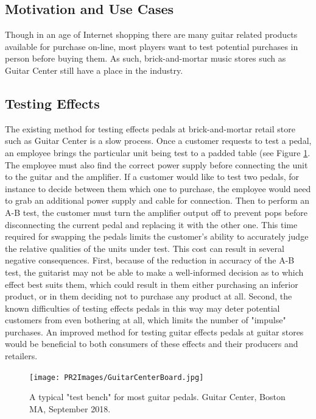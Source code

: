 \documentclass{article}
\begin{document}
	\subsection{Motivation and Use Cases}

	
	Though in an age of Internet shopping there are many guitar related products available for purchase on-line, most players want to test potential purchases in person before buying them.  As such, brick-and-mortar music stores such as Guitar Center still have a place in the industry.
	\subsection{Testing Effects}
	The existing method for testing effects pedals at brick-and-mortar retail store such as Guitar Center is a slow process.  Once a customer requests to test a pedal, an employee brings the particular unit being test to a padded table (see Figure \ref{fig:GuitarCenterBoard}.  The employee must also find the correct power supply before connecting the unit to the guitar and the amplifier.  If a customer would like to test two pedals, for instance to decide between them which one to purchase, the employee would need to grab an additional power supply and cable for connection.  Then to perform an A-B test, the customer must turn the amplifier output off to prevent pops before disconnecting the current pedal and replacing it with the other one.  This time required for swapping the pedals limits the customer's ability to accurately judge the relative qualities of the units under test.  This cost can result in several negative consequences.  First, because of the reduction in accuracy of the A-B test, the guitarist may not be able to make a well-informed decision as to which effect best suits them, which could result in them either purchasing an inferior product, or in them deciding not to purchase any product at all.  Second, the known difficulties of testing effects pedals in this way may deter potential customers from even bothering at all, which limits the number of "impulse" purchases.  An improved method for testing guitar effects pedals at guitar stores would be beneficial to both consumers of these effects and their producers and retailers.

	\begin{figure}
		\centering
		\texttt{[image: PR2Images/GuitarCenterBoard.jpg]}
		\caption{A typical "test bench" for most guitar pedals.  Guitar Center, Boston MA, September 2018.}
		\label{fig:GuitarCenterBoard}
	\end{figure}
\end{document}
